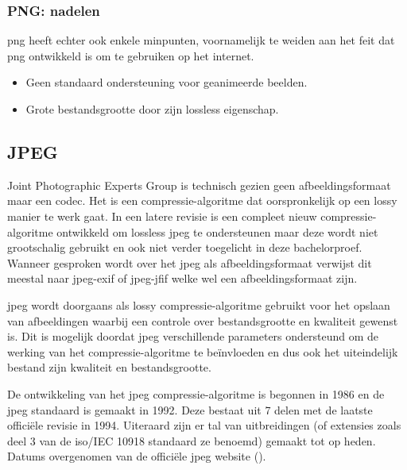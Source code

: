 \subsubsection{PNG: nadelen}
\label{sec:afbeeldingscompressie-png-nadelen}

\Gls{png} heeft echter ook enkele minpunten, voornamelijk te weiden aan het feit dat \gls{png} ontwikkeld is om te gebruiken op het internet.

\begin{itemize}
	\item Geen standaard ondersteuning voor geanimeerde beelden.
	
	\item Grote bestandsgrootte door zijn \gls{lossless} eigenschap.
\end{itemize}

\subsection{JPEG}
\label{sec:afbeeldingscompressie-jpeg}

Joint Photographic Experts Group is technisch gezien geen \gls{afbeeldingsformaat} maar een \gls{codec}. Het is een \gls{compressie-algoritme} dat oorspronkelijk op een \gls{lossy} manier te werk gaat. In een latere revisie is een compleet nieuw \gls{compressie-algoritme} ontwikkeld om \gls{lossless} \gls{jpeg} te ondersteunen maar deze wordt niet grootschalig gebruikt en ook niet verder toegelicht in deze bachelorproef. Wanneer gesproken wordt over het \gls{jpeg} als \gls{afbeeldingsformaat} verwijst dit meestal naar \gls{jpeg-exif} of \gls{jpeg-jfif} welke wel een \gls{afbeeldingsformaat} zijn.

\gls{jpeg} wordt doorgaans als \gls{lossy} \gls{compressie-algoritme} gebruikt voor het opslaan van afbeeldingen waarbij een controle over bestandsgrootte en kwaliteit gewenst is. Dit is mogelijk doordat \gls{jpeg} verschillende parameters ondersteund om de werking van het \gls{compressie-algoritme} te beïnvloeden en dus ook het uiteindelijk bestand zijn kwaliteit en bestandsgrootte.

De ontwikkeling van het \gls{jpeg} \gls{compressie-algoritme} is begonnen in 1986 en de \gls{jpeg} standaard is gemaakt in 1992. Deze bestaat uit 7 delen met de laatste officiële revisie in 1994. Uiteraard zijn er tal van uitbreidingen (of extensies zoals deel 3 van de \gls{iso}/IEC 10918 standaard ze benoemd) gemaakt tot op heden. Datums overgenomen van de officiële \gls{jpeg} website (\cite{jpegorg}). 

